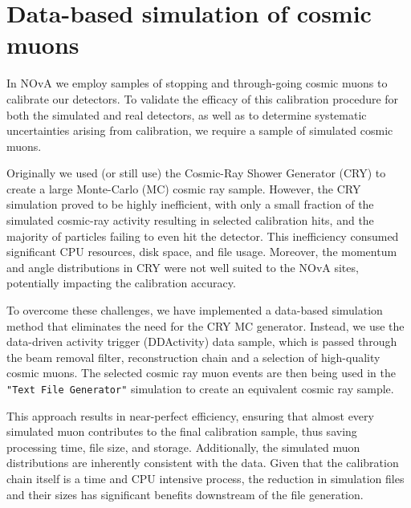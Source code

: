 
\section{Data-based simulation of cosmic muons}\label{sec:DataBasedSimulation}

In NOvA we employ samples of stopping and through-going cosmic muons to calibrate our detectors. To validate the efficacy of this calibration procedure for both the simulated and real detectors, as well as to determine systematic uncertainties arising from calibration, we require a sample of simulated cosmic muons.

Originally we used (or still use) the Cosmic-Ray Shower Generator (CRY) \cite{CRY} to create a large Monte-Carlo (MC) cosmic ray sample. However, the CRY simulation proved to be highly inefficient, with only a small fraction of the simulated cosmic-ray activity resulting in selected calibration hits, and the majority of particles failing to even hit the detector. This inefficiency consumed significant CPU resources, disk space, and file usage. Moreover, the momentum and angle distributions in CRY were not well suited to the NOvA sites, potentially impacting the calibration accuracy.

To overcome these challenges, we have implemented a data-based simulation method that eliminates the need for the CRY MC generator. Instead, we use the data-driven activity trigger (DDActivity) data sample, which is passed through the beam removal filter, reconstruction chain and a selection of high-quality cosmic muons. The selected cosmic ray muon events are then being used in the \texttt{"Text File Generator"} simulation to create an equivalent cosmic ray sample.

This approach results in near-perfect efficiency, ensuring that almost every simulated muon contributes to the final calibration sample, thus saving processing time, file size, and storage. Additionally, the simulated muon distributions are inherently consistent with the data. Given that the calibration chain itself is a time and CPU intensive process, the reduction in simulation files and their sizes has significant benefits downstream of the file generation.

